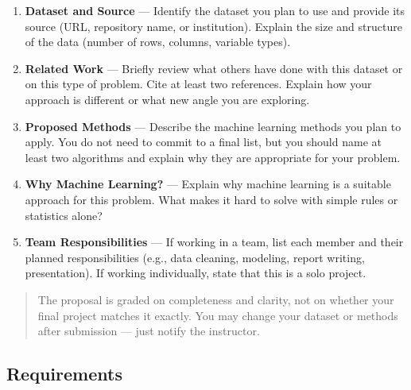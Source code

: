 \documentclass[
  10pt,
]{article}
\begin{document}
\begin{enumerate}
\def\labelenumi{\arabic{enumi}.}
\item
  \textbf{Dataset and Source} --- Identify the dataset you plan to use
  and provide its source (URL, repository name, or institution). Explain
  the size and structure of the data (number of rows, columns, variable
  types).
\item
  \textbf{Related Work} --- Briefly review what others have done with
  this dataset or on this type of problem. Cite at least two references.
  Explain how your approach is different or what new angle you are
  exploring.
\item
  \textbf{Proposed Methods} --- Describe the machine learning methods
  you plan to apply. You do not need to commit to a final list, but you
  should name at least two algorithms and explain why they are
  appropriate for your problem.
\item
  \textbf{Why Machine Learning?} --- Explain why machine learning is a
  suitable approach for this problem. What makes it hard to solve with
  simple rules or statistics alone?
\item
  \textbf{Team Responsibilities} --- If working in a team, list each
  member and their planned responsibilities (e.g., data cleaning,
  modeling, report writing, presentation). If working individually,
  state that this is a solo project.
\end{enumerate}

\begin{quote}
The proposal is graded on completeness and clarity, not on whether your
final project matches it exactly. You may change your dataset or methods
after submission --- just notify the instructor.
\end{quote}

\subsection{Requirements}\label{requirements}
\end{document}
